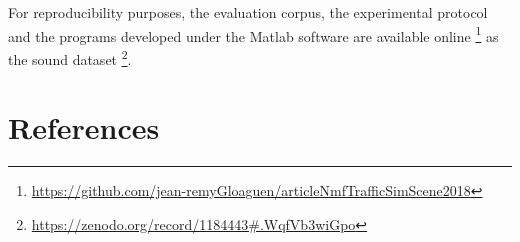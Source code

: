 \documentclass[review,5p,twocolumn,sort&compress,times]{elsarticle}
\begin{document}
For reproducibility purposes, the evaluation corpus, the experimental protocol and the programs developed under the Matlab software are available online \footnote{\url{https://github.com/jean-remyGloaguen/articleNmfTrafficSimScene2018}} as the sound dataset \footnote{\url{https://zenodo.org/record/1184443#.WqfVb3wiGpo}}. 


\section*{References}


\end{document}
